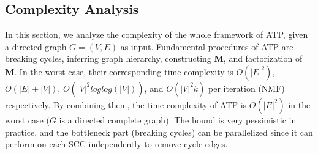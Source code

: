 \documentclass[letterpaper]{article} \usepackage{aaai19}  \usepackage{times}  \usepackage{helvet}  \usepackage{courier}  \usepackage{url}  \usepackage{graphicx}  \usepackage{booktabs} \usepackage{xcolor}
\begin{document}
\begin{comment}
where a row $\vec{f}_i \in \boldsymbol{F}$ describes the $i$-th variable with $k \in \mathbb{N}_0^+$ factors. $k$ represents the dimensionality of the factorization. The first $|V|$ rows of $\boldsymbol{F}$ represent nodes' out-reach (source) vectors ($\boldsymbol{S}$), and the last $|V|$ row of $\boldsymbol{F}$ represent nodes' in-reach (target) vectors ($\boldsymbol{T}$). $w_0$ and $\vec{w}_s$, and $w_0$ and $\vec{w}_{s+|V|}$ are node $s$'s biased term of being a source node and a target node respectively. Here FM is exactly the same as a (biased) matrix factorization as we have described in section ~\ref{sec:atp_nmf}. The model parameters ($w_0$, $\vec{w}$, and $\boldsymbol{F}$) can be learned efficiently by gradient descent methods as follows:

\begin{equation}
\frac{\partial}{\partial \theta}\hat{y}(\vec{x}) = \begin{cases} 1, & \mbox{if $\theta$ is $w_0$} \\ 
x_i, & \mbox{if $\theta$ is $w_i$} \\
x_i\sum_{j=1}^{2|V|} f_{j,l}x_j - f_{i,l}x_i^2, & \mbox{if $\theta$ is $f_{i,l}$} 
\end{cases}
\label{eq:differential}
\end{equation}

In general, each gradient can be computed in constant time $O(1)$. And all parameter updates for a case $(\vec{x},y)$ can be done in $O(k|V|)$~\cite{Rendle2010FM}.
\end{comment}






\subsection{Complexity Analysis}
\label{sec:complexityAnalysis}

In this section, we analyze the complexity of the whole framework of ATP, given a directed graph $G=(V,E)$ as input. Fundamental procedures of ATP are breaking cycles, inferring graph hierarchy, constructing $\boldsymbol{M}$, and factorization of $\boldsymbol{M}$. In the worst case, their corresponding time complexity is $O(|E|^2)$, $O(|E|+|V|)$, $O(|V|^2loglog(|V|))$, and $O(|V|^2k)$ per iteration (NMF) respectively. By combining them, the time complexity of ATP is $O(|E|^2)$ in the worst case ($G$ is a directed complete graph). The bound is very pessimistic in practice, and the bottleneck part (breaking cycles) can be parallelized since it can perform on each SCC independently to remove cycle edges. 
\end{document}
